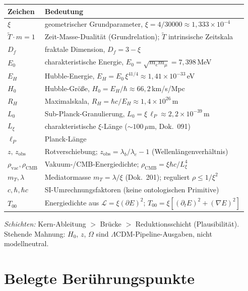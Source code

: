 \noindent
\begin{tabular}{@{}ll@{}}
\toprule
Zeichen & Bedeutung \\
\midrule
$\xi$ & geometrischer Grundparameter, $\xi = 4/30000 \approx 1{,}333\times10^{-4}$ \\
$\tilde T\cdot m=1$ & Zeit-Masse-Dualität (Grundrelation); $\tilde T$ intrinsische Zeitskala \\
$D_f$ & fraktale Dimension, $D_f = 3-\xi$ \\
$E_0$ & charakteristische Energie, $E_0=\sqrt{m_e m_\mu}=7{,}398$\,MeV \\
$E_H$ & Hubble-Energie, $E_H = E_0\,\xi^{41/4} \approx 1{,}41\times10^{-33}$\,eV \\
$H_0$ & Hubble-Größe, $H_0 = E_H/\hbar \approx 66{,}2$\,km/s/Mpc \\
$R_H$ & Maximalskala, $R_H = \hbar c/E_H \approx 1{,}4\times10^{26}$\,m \\
$L_0$ & Sub-Planck-Granulierung, $L_0 = \xi\,\ell_P \approx 2{,}2\times10^{-39}$\,m \\
$L_\xi$ & charakteristische $\xi$-Länge ($\sim 100\,\mu$m, Dok.~091) \\
$\ell_P$ & Planck-Länge \\
$z,\,z_{\text{obs}}$ & Rotverschiebung; $z_{\text{obs}}=\lambda_b/\lambda_e-1$ (Wellenlängenverhältnis) \\
$\rho_{\text{vac}},\rho_{\text{CMB}}$ & Vakuum-/CMB-Energiedichte; $\rho_{\text{CMB}}=\xi\hbar c/L_\xi^4$ \\
$m_T,\lambda$ & Mediatormasse $m_T=\lambda/\xi$ (Dok.~201); reguliert $\rho\le 1/\xi^2$ \\
$c,\hbar,\hbar c$ & SI-Umrechnungsfaktoren (keine ontologischen Primitive) \\
$T_{00}$ & Energiedichte aus $\mathcal{L}=\xi(\partial E)^2$; $T_{00}=\xi[(\partial_t E)^2+(\nabla E)^2]$ \\
\bottomrule
\end{tabular}

\medskip
\noindent\emph{Schichten:} Kern-Ableitung $>$ Brücke $>$ Reduktionsschicht
(Plausibilität). Stehende Mahnung: $H_0$, $z$, $\Omega$ sind
$\Lambda$CDM-Pipeline-Ausgaben, nicht modellneutral.

\section{Belegte Berührungspunkte}
\label{sec:263-belegt}

